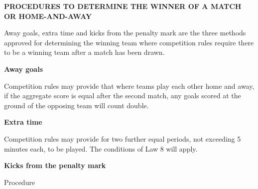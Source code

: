 \clearpage
\sffamily
{\bfseries\color[rgb]{0.4,0.4,0.4}
PROCEDURES TO DETERMINE THE WINNER OF A MATCH OR HOME-AND-AWAY }

\bigskip

Away goals, extra time and kicks from the penalty mark are the three methods approved for determining the winning team where competition rules require there to be a winning team after a match has been drawn.

\bigskip

{\bfseries Away goals}

Competition rules may provide that where teams play each other home and away, if the aggregate score is equal after the second match, any goals scored at the ground of the opposing team will count double.

\bigskip

{\bfseries Extra time}

Competition rules may provide for two further equal periods, not exceeding 5 minutes each, to be played. The conditions of Law 8 will apply. 
{\color[rgb]{0.4,0.4,0.4}{(replaces: Competition rules may
provide for two further equal periods, not exceeding 15 minutes each, to be played. The conditions of Law 8 will apply. )}}

\bigskip

{\bfseries Kicks from the penalty mark }

Procedure

\headlinebox
 
